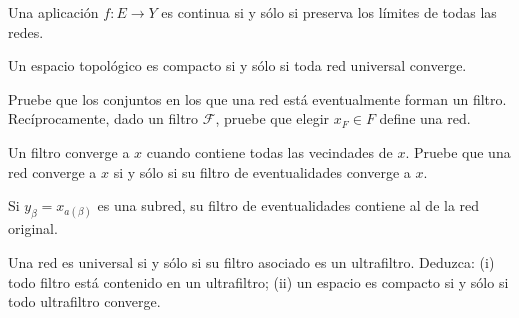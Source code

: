 \begin{ejercicio}\label{ej:v3-l14-3}
Una aplicación $f:E\to Y$ es continua si y sólo si preserva los límites de todas las redes.
\end{ejercicio}


\begin{ejercicio}\label{ej:v3-l14-4}
Un espacio topológico es compacto si y sólo si toda red universal converge.
\end{ejercicio}


\begin{ejercicio}\label{ej:v3-l14-5}
Pruebe que los conjuntos en los que una red está eventualmente forman un filtro. Recíprocamente, dado un filtro $\mathcal F$, pruebe que elegir $x_F\in F$ define una red.
\end{ejercicio}


\begin{ejercicio}\label{ej:v3-l14-6}
Un filtro converge a $x$ cuando contiene todas las vecindades de $x$. Pruebe que una red converge a $x$ si y sólo si su filtro de eventualidades converge a $x$.
\end{ejercicio}


\begin{ejercicio}\label{ej:v3-l14-7}
Si $y_\beta=x_{a(\beta)}$ es una subred, su filtro de eventualidades contiene al de la red original.
\end{ejercicio}


\begin{ejercicio}\label{ej:v3-l14-8}
Una red es universal si y sólo si su filtro asociado es un ultrafiltro. Deduzca: (i) todo filtro está contenido en un ultrafiltro; (ii) un espacio es compacto si y sólo si todo ultrafiltro converge.
\end{ejercicio}


